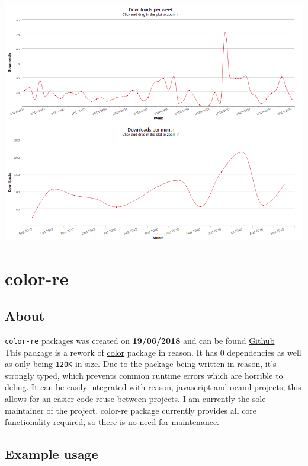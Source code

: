 \documentclass{article}
\begin{document}
\begin{center}
  \includegraphics[scale=0.5]{react-routes-map.png}
\end{center}

\newpage

\section{color-re}

\subsection{About}
\begin{flushleft}
\texttt{color-re} packages was created on \textbf{19/06/2018} and can be found \href{https://github.com/WhoAteDaCake/color-re}{Github} \\
This package is a rework of \href{https://github.com/Qix-/color}{color} package in reason. It has 0 dependencies as well as only being \texttt{120K} in size. Due to the package being written in reason, it's strongly typed, which prevents common runtime errors which are horrible to debug. It can be easily integrated with reason, javascript and ocaml projects, this allows for an easier code reuse between projects. I am currently the sole maintainer of the project. color-re package currently provides all core functionality required, so there is no need for maintenance.
\end{flushleft}

\subsection{Example usage}
\end{document}
